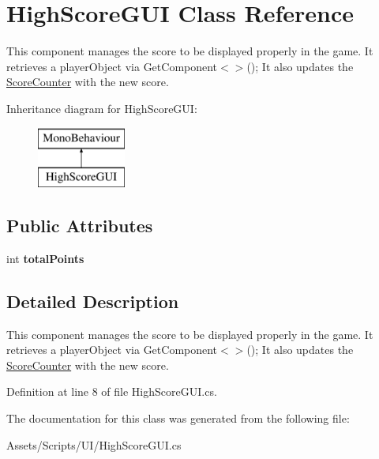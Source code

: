 \hypertarget{class_high_score_g_u_i}{\section{High\+Score\+G\+U\+I Class Reference}
\label{class_high_score_g_u_i}
}


This component manages the score to be displayed properly in the game. It retrieves a player\+Object via Get\+Component$<$$>$(); It also updates the \hyperlink{class_score_counter}{Score\+Counter} with the new score.  


Inheritance diagram for High\+Score\+G\+U\+I\+:\begin{figure}[H]
\begin{center}
\leavevmode
\includegraphics[height=2.000000cm]{class_high_score_g_u_i}
\end{center}
\end{figure}
\subsection*{Public Attributes}
\begin{DoxyCompactItemize}
\item 
\hypertarget{class_high_score_g_u_i_a54ad721c58e2a92affe772079cbfe1e4}{int {\bfseries total\+Points}}\label{class_high_score_g_u_i_a54ad721c58e2a92affe772079cbfe1e4}

\end{DoxyCompactItemize}


\subsection{Detailed Description}
This component manages the score to be displayed properly in the game. It retrieves a player\+Object via Get\+Component$<$$>$(); It also updates the \hyperlink{class_score_counter}{Score\+Counter} with the new score. 



Definition at line 8 of file High\+Score\+G\+U\+I.\+cs.



The documentation for this class was generated from the following file\+:\begin{DoxyCompactItemize}
\item 
Assets/\+Scripts/\+U\+I/High\+Score\+G\+U\+I.\+cs\end{DoxyCompactItemize}
